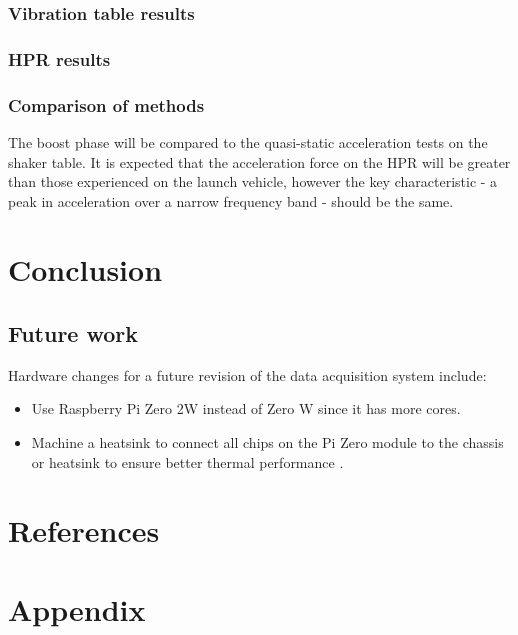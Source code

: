 \documentclass[a4paper,11pt]{article}
\begin{document}
\subsubsection{Vibration table results}
\subsubsection{HPR results}
\subsubsection{Comparison of methods}
The boost phase will be compared to the quasi-static acceleration tests on the shaker table. It is expected that the acceleration force on the HPR will be greater than those experienced on the launch vehicle, however the key characteristic - a peak in acceleration over a narrow frequency band - should be the same.

\section{Conclusion}
\subsection{Future work}

Hardware changes for a future revision of the data acquisition system include:

\begin{itemize}
  \item Use Raspberry Pi Zero 2W instead of Zero W since it has more cores.
  \item Machine a heatsink to connect all chips on the Pi Zero module to the chassis or heatsink to ensure better thermal performance \cite{guertin2022raspberry}.
\end{itemize}

\section{References}

\printbibliography[heading=none]

\section{Appendix}
\end{document}
